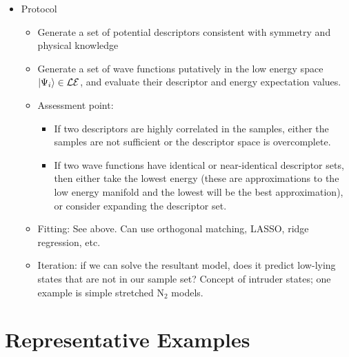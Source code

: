 \documentclass[prl,12pt,onecolumn,nofootinbib,notitlepage,english,superscriptaddress]{revtex4-1}
\newcommand{\lucas}[1]{{\color{GREEN}{\bf LKW: #1}}}
\begin{document}
\begin{itemize}
\item Protocol \lucas{this overlaps a little with 'Fitting procedure'; we should discuss how to merge/cut them. We will also probably want a graphic.} 
   \begin{itemize}
   \item Generate a set of potential descriptors consistent with symmetry and physical knowledge
   \item Generate a set of wave functions putatively in the low energy space $|\Psi_i\rangle \in {\cal LE} $, and evaluate their descriptor and energy expectation values.
   \item Assessment point: 
      \begin{itemize}
      \item If two descriptors are highly correlated in the samples, either the samples are not sufficient or the descriptor space is overcomplete.
      \item If two wave functions have identical or near-identical descriptor sets, then either take the lowest energy (these are approximations to the low energy manifold and the lowest will be the best approximation), or consider expanding the descriptor set.
      \end{itemize}
   \item Fitting: See above. Can use orthogonal matching, LASSO, ridge regression, etc.
   \item Iteration: if we can solve the resultant model, does it predict low-lying states that are not in our sample set? Concept of intruder states; one example is simple stretched N$_2$ models.
   \end{itemize}
\end{itemize}





\section{Representative Examples}
\end{document}
